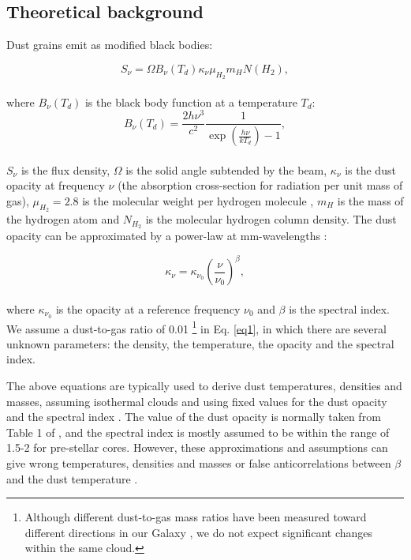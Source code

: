 \documentclass{aa}
\begin{document}
\subsection{Theoretical background}

Dust grains emit as modified black bodies:

\begin{equation}
S_{\nu} = \Omega B_{\nu}(T_{d}) \kappa_{\nu} \mu_{H_2} m_{H}N(H_{2}),  
\label{eq1}
\end{equation}
\\
where $B_{\nu}(T_{d})$ is the black body function at a temperature $T_{d}$:
\begin{equation}
B_{\nu}(T_{d}) = \frac{2h\nu^3}{c^2} \frac{1}{\exp \left(\frac{h\nu}{kT_{d}}\right)-1},
\end{equation}
\\
$S_{\nu}$ is the flux density, $\Omega$ is the solid angle subtended by the beam, $\kappa_{\nu}$ is the dust opacity at frequency $\nu$ (the absorption cross-section for radiation per unit mass of gas), $\mu_{H_2}=2.8$ is the molecular weight per hydrogen molecule , $m_{H}$ is the mass of the hydrogen atom and $N_{H_{2}}$ is the molecular hydrogen column density. The dust opacity can be approximated by a power-law at mm-wavelengths :

\begin{equation}
\kappa_{\nu} = \kappa_{\nu_0}\left( \frac{\nu}{\nu_{0}}\right)^{\beta},
\end{equation}
\\
where $\kappa_{\nu_0} $ is the opacity at a reference frequency $\nu_0$ and $\beta$ is the spectral index. We assume a dust-to-gas ratio of 0.01 \footnote{Although different dust-to-gas mass ratios have been measured toward different directions in our Galaxy , we do not expect significant changes within the same cloud.} in Eq. \eqref{eq1}, in which there are several unknown parameters: the density, the temperature, the opacity and the spectral index. 

The above equations are typically used to derive dust temperatures, densities and masses, assuming isothermal clouds and using fixed values for the dust opacity and the spectral index \citep[e.g.]{2005ApJ...624..254S}. The value of the dust opacity is normally taken from Table 1 of , and the spectral index is mostly assumed to be within the range of 1.5-2 for pre-stellar cores. However, these approximations and assumptions can give wrong temperatures, densities and masses or false anticorrelations between $\beta$ and the dust temperature .
\end{document}
